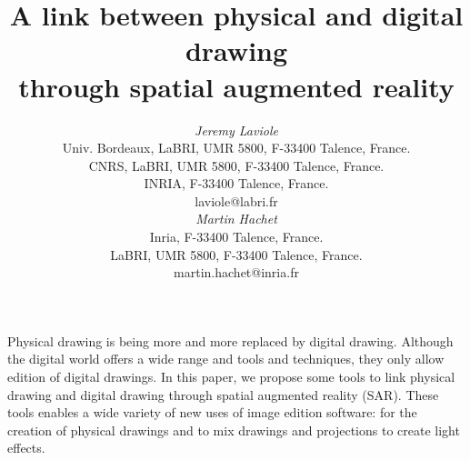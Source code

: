 \documentclass{article}
\begin{document}




\title{A link between physical and digital drawing \\
       through spatial augmented reality}


\author{
\parbox[t]{9cm}{\centering
	     {\em Jeremy Laviole}\\
   Univ. Bordeaux, LaBRI, UMR 5800, F-33400 Talence, France.\\
  CNRS, LaBRI, UMR 5800, F-33400 Talence, France.\\
   INRIA, F-33400 Talence, France.\\
	     laviole@labri.fr \vspace*{-0.4cm}}
\parbox[t]{9cm}{\centering
	     {\em Martin Hachet}\\
	     Inria, F-33400 Talence, France.\\
	     LaBRI, UMR 5800, F-33400 Talence, France.\\
	     martin.hachet@inria.fr}
}

\maketitle

\abstract

Physical drawing is being more and more replaced by digital drawing. Although the digital world offers a wide range and tools and techniques, they only allow edition of digital drawings.
In this paper, we propose some tools to link physical drawing and digital drawing through spatial augmented reality (SAR). These tools enables a wide variety of new uses of image edition software: for the creation of physical drawings and to mix drawings and projections to create light effects.                                                                                                                                                                                                                                                                                               
\end{document}
